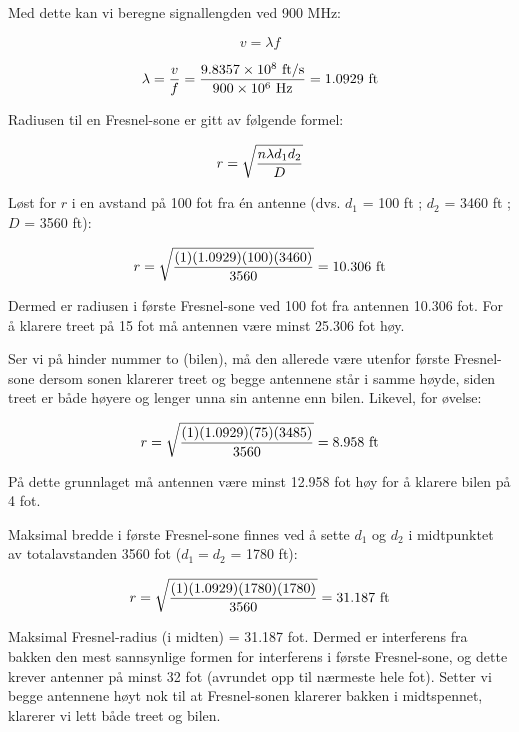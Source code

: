 Med dette kan vi beregne signallengden ved 900 MHz:

$$v = \lambda f$$

$$\lambda = {v \over f} = {9.8357 \times 10^{8} \hbox{ ft/s} \over 900 \times 10^6 \hbox{ Hz}} = 1.0929 \hbox{ ft}$$

\vskip 10pt

Radiusen til en Fresnel-sone er gitt av følgende formel:

$$r = \sqrt{{n \lambda d_1 d_2} \over D}$$

\vskip 10pt

Løst for $r$ i en avstand på 100 fot fra én antenne (dvs. $d_1$ = 100 ft ; $d_2$ = 3460 ft ; $D$ = 3560 ft):

$$r = \sqrt{{(1) (1.0929) (100) (3460)} \over 3560} = 10.306 \hbox{ ft}$$

Dermed er radiusen i første Fresnel-sone ved 100 fot fra antennen 10.306 fot. For å klarere treet på 15 fot må antennen være minst 25.306 fot høy.

\vskip 10pt

Ser vi på hinder nummer to (bilen), må den allerede være utenfor første Fresnel-sone dersom sonen klarerer treet og begge antennene står i samme høyde, siden treet er både høyere og lenger unna sin antenne enn bilen. Likevel, for øvelse:

$$r = \sqrt{{(1) (1.0929) (75) (3485)} \over 3560} = 8.958 \hbox{ ft}$$

På dette grunnlaget må antennen være minst 12.958 fot høy for å klarere bilen på 4 fot.

\vskip 10pt

Maksimal bredde i første Fresnel-sone finnes ved å sette $d_1$ og $d_2$ i midtpunktet av totalavstanden 3560 fot ($d_1 = d_2$ = 1780 ft):

$$r = \sqrt{{(1) (1.0929) (1780) (1780)} \over 3560} = 31.187 \hbox{ ft}$$

Maksimal Fresnel-radius (i midten) = 31.187 fot. Dermed er interferens fra bakken den mest sannsynlige formen for interferens i første Fresnel-sone, og dette krever antenner på minst 32 fot (avrundet opp til nærmeste hele fot). Setter vi begge antennene høyt nok til at Fresnel-sonen klarerer bakken i midtspennet, klarerer vi lett både treet og bilen.











\vfil \eject

